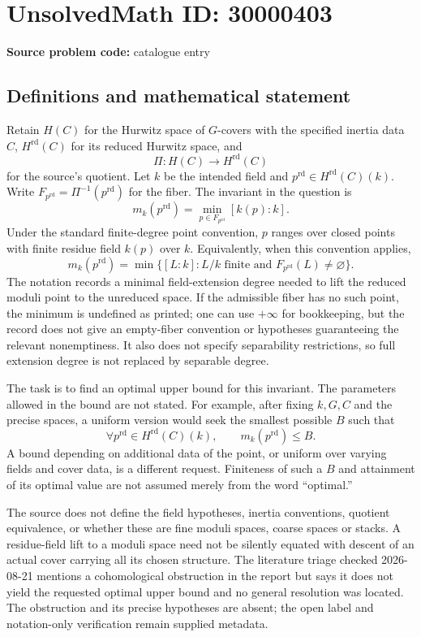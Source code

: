 \documentclass[11pt]{article}
\begin{document}
\section*{UnsolvedMath ID: 30000403}
\textbf{Source problem code:} catalogue entry
\subsection{Definitions and mathematical statement}
Retain \(H(C)\) for the Hurwitz space of \(G\)-covers with the specified inertia data \(C\), \(H^{\mathrm{rd}}(C)\) for its reduced Hurwitz space, and
\[
 \Pi:H(C)\longrightarrow H^{\mathrm{rd}}(C)
\]
for the source's quotient. Let \(k\) be the intended field and \(p^{\mathrm{rd}}\in H^{\mathrm{rd}}(C)(k)\). Write \(F_{p^{\mathrm{rd}}}=\Pi^{-1}(p^{\mathrm{rd}})\) for the fiber. The invariant in the question is
\[
 m_k(p^{\mathrm{rd}})=\min_{p\in F_{p^{\mathrm{rd}}}}[k(p):k].
\]
Under the standard finite-degree point convention, \(p\) ranges over closed points with finite residue field \(k(p)\) over \(k\). Equivalently, when this convention applies,
\[
 m_k(p^{\mathrm{rd}})=\min\{[L:k]:L/k\text{ finite and }F_{p^{\mathrm{rd}}}(L)\ne\varnothing\}.
\]
The notation records a minimal field-extension degree needed to lift the reduced moduli point to the unreduced space. If the admissible fiber has no such point, the minimum is undefined as printed; one can use \(+\infty\) for bookkeeping, but the record does not give an empty-fiber convention or hypotheses guaranteeing the relevant nonemptiness. It also does not specify separability restrictions, so full extension degree is not replaced by separable degree.

The task is to find an optimal upper bound for this invariant. The parameters allowed in the bound are not stated. For example, after fixing \(k,G,C\) and the precise spaces, a uniform version would seek the smallest possible \(B\) such that
\[
 \forall p^{\mathrm{rd}}\in H^{\mathrm{rd}}(C)(k),\qquad m_k(p^{\mathrm{rd}})\leq B.
\]
A bound depending on additional data of the point, or uniform over varying fields and cover data, is a different request. Finiteness of such a \(B\) and attainment of its optimal value are not assumed merely from the word ``optimal.''

The source does not define the field hypotheses, inertia conventions, quotient equivalence, or whether these are fine moduli spaces, coarse spaces or stacks. A residue-field lift to a moduli space need not be silently equated with descent of an actual cover carrying all its chosen structure. The literature triage checked 2026-08-21 mentions a cohomological obstruction in the report but says it does not yield the requested optimal upper bound and no general resolution was located. The obstruction and its precise hypotheses are absent; the open label and notation-only verification remain supplied metadata.
\end{document}
